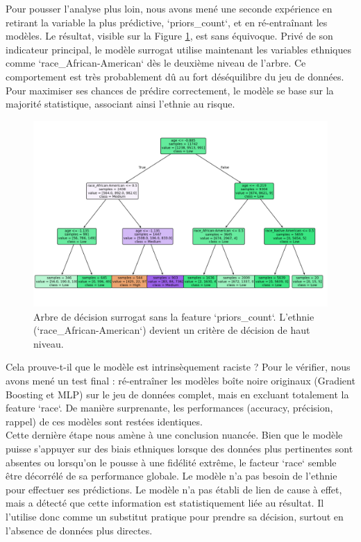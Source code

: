 \documentclass{article}
\begin{document}
Pour pousser l'analyse plus loin, nous avons mené une seconde expérience en retirant la variable la plus prédictive, `priors\_count`, et en ré-entraînant les modèles. Le résultat, visible sur la Figure \ref{fig:tree_without_prior}, est sans équivoque. Privé de son indicateur principal, le modèle surrogat utilise maintenant les variables ethniques comme `race\_African-American` dès le deuxième niveau de l'arbre. Ce comportement est très probablement dû au fort déséquilibre du jeu de données. Pour maximiser ses chances de prédire correctement, le modèle se base sur la majorité statistique, associant ainsi l'ethnie au risque.

\begin{figure}[h!]
    \centering
    \includegraphics[width=\textwidth]{tree_withoutprior.png}
    \caption{Arbre de décision surrogat sans la feature `priors\_count`. L'ethnie (`race\_African-American`) devient un critère de décision de haut niveau.}
    \label{fig:tree_without_prior}
\end{figure}

\quad Cela prouve-t-il que le modèle est intrinsèquement raciste ? Pour le vérifier, nous avons mené un test final : ré-entraîner les modèles boîte noire originaux (Gradient Boosting et MLP) sur le jeu de données complet, mais en excluant totalement la feature `race`. De manière surprenante, les performances (accuracy, précision, rappel) de ces modèles sont restées identiques.\\

Cette dernière étape nous amène à une conclusion nuancée. Bien que le modèle puisse s'appuyer sur des biais ethniques lorsque des données plus pertinentes sont absentes ou lorsqu'on le pousse à une fidélité extrême, le facteur `race` semble être décorrélé de sa performance globale. Le modèle n'a pas besoin de l'ethnie pour effectuer ses prédictions. Le modèle n'a pas établi de lien de cause à effet, mais a détecté que cette information est statistiquement liée au résultat. Il l'utilise donc comme un substitut pratique pour prendre sa décision, surtout en l'absence de données plus directes.\\
\end{document}
